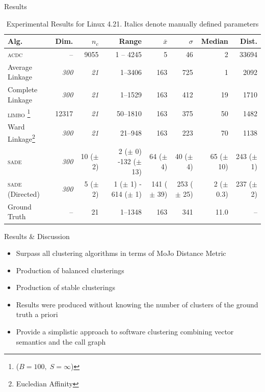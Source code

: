 \documentclass{beamer}
\begin{document}
\begin{frame}{Results}
    
    \begin{table}
    \Tiny
    \begin{tabular}{lrrrrrrr}
    \hline
    Alg. & Dim.  & $n_c$ & Range & $\bar x$ & $\sigma$ & Median & Dist. \\
    \hline
    \textsc{acdc}  & -- & 9055 & 1 -- 4245 & 5 & 46 & 2 & 33694\\
    Average Linkage  & \emph{300} & \emph{21} & 1--3406 & 163 & 725 & 1 & 2092 \\
    Complete Linkage  & \emph{300} & \emph{21} & 1--1529 & 163 & 412 & 19 & 1710 \\
    \textsc{limbo}  \footnote{($B=100, \; S = \infty$)} & 12317 &\emph{21} & 50--1810 & 163 & 375 & 50  & 1482 \\

    Ward Linkage\footnote{Eucledian Affinity} & \emph{300} & \emph{21} & 21--948 & 163 & 223 & 70 & 1138 \\
        
    \textsc{sade} & \emph{300} & 10 ($\pm$ 2)  & 2 ($\pm$ 0) -132 ($\pm$ 13) & 64 ($\pm$ 4) & 40 ($\pm$ 4) & 65 ($\pm$ 10) & 243 ($\pm$ 1)  \\
    \textsc{sade} (Directed) & \emph{300} & 5 ($\pm$ 2) & 1 ($\pm$ 1) - 614 ($\pm$ 1) & 141 ($\pm$ 39) & 253 ($\pm$ 25) & 2 ($\pm$ 0.3)  & 237 ($\pm$ 2) \\
    \hline
    Ground Truth & -- & 21 & 1--1348 & 163 & 341 & 11.0 & -- \\
    \hline
  \end{tabular}
    \caption{Experimental Results for Linux 4.21. Italics denote manually defined parameters}

\end{table}
    
\end{frame}
 
\begin{frame}{Results \& Discussion}

\begin{itemize}
    \item<1-> Surpass all clustering algorithms in terms of MoJo Distance Metric
    \item<2-> Production of balanced clusterings 
    \item<3-> Production of stable clusterings 
    \item<4-> Results were produced without knowing the number of clusters of the ground truth a priori
    \item<5-> Provide a simplistic approach to software clustering combining vector semantics and the call graph
\end{itemize}
    
\end{frame}
\end{document}

